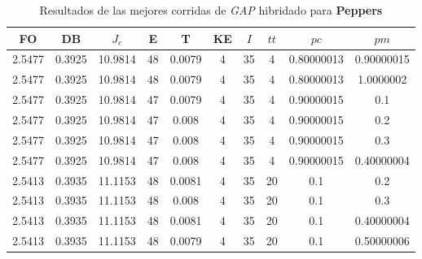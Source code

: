 \begin{table}[h!]
    \footnotesize
    \begin{center}
        \begin{tabular}{|c|c|c|c|c|c|c|c|c|c|}
        \hline
            {\bf FO} & {\bf DB} & $J_e$ & {\bf E} & {\bf T} & {\bf KE} & $I$ & $tt$ & $pc$ & $pm$ \\
        \hline
        \hline
            2.5477 & 0.3925  & 10.9814 & 48 & 0.0079 & 4 & 35 & 4 & 0.80000013 & 0.90000015\\
        \hline
        \hline
            2.5477 & 0.3925  & 10.9814 & 48 & 0.0079 & 4 & 35 & 4 & 0.80000013 & 1.0000002\\
        \hline
        \hline
            2.5477 & 0.3925  & 10.9814 & 47 & 0.0079 & 4 & 35 & 4 & 0.90000015 & 0.1\\
        \hline
        \hline
            2.5477 & 0.3925  & 10.9814 & 47 & 0.008 & 4 & 35 & 4 & 0.90000015 & 0.2\\
        \hline
        \hline
            2.5477 & 0.3925  & 10.9814 & 47 & 0.008 & 4 & 35 & 4 & 0.90000015 & 0.3\\
        \hline
        \hline
            2.5477 & 0.3925  & 10.9814 & 47 & 0.008 & 4 & 35 & 4 & 0.90000015 & 0.40000004\\
        \hline
        \hline
            2.5413 & 0.3935  & 11.1153 & 48 & 0.0081 & 4 & 35 & 20 & 0.1 & 0.2\\
        \hline
        \hline
            2.5413 & 0.3935  & 11.1153 & 48 & 0.008 & 4 & 35 & 20 & 0.1 & 0.3\\
        \hline
        \hline
            2.5413 & 0.3935  & 11.1153 & 48 & 0.0081 & 4 & 35 & 20 & 0.1 & 0.40000004\\
        \hline
        \hline
            2.5413 & 0.3935  & 11.1153 & 48 & 0.0079 & 4 & 35 & 20 & 0.1 & 0.50000006\\
        \hline
        \end{tabular}
        \caption{Resultados de las mejores corridas de \emph{GAP} hibridado para {\bf Peppers}}
        \label{tb:tableGAP45}
    \end{center}
\end{table}
